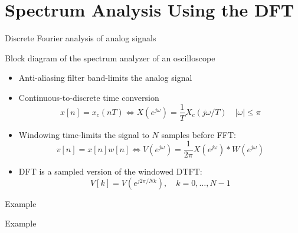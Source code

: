 \documentclass[10pt, aspectratio=169, handout]{beamer}
\begin{document}
\section{Spectrum Analysis Using the DFT}
\begin{frame}{Discrete Fourier analysis of analog signals}

Block diagram of the spectrum analyzer of an oscilloscope
\begin{center}
	\resizebox{0.9\textwidth}{!}{}
\end{center}

\begin{itemize}
	\item Anti-aliasing filter band-limits the analog signal 
	\item Continuous-to-discrete time conversion
	\begin{equation*}
		x[n] = x_c(nT) \Longleftrightarrow X(e^{j\omega}) = \frac{1}{T}X_c(j\omega/T) \quad |\omega| \leq \pi \tag{no aliasing}
	\end{equation*}
	\item Windowing time-limits the signal to $N$ samples before FFT: 
	\begin{equation*}
		v[n] = x[n]w[n] \Longleftrightarrow V(e^{j\omega}) = \frac{1}{2\pi} X(e^{j\omega}) \ast W(e^{j\omega})
	\end{equation*}
	\item DFT is a sampled version of the windowed DTFT:
	\begin{equation*}
		V[k] = V(e^{j2\pi/Nk}), \quad k = 0, \ldots, N-1
	\end{equation*}
\end{itemize}
\end{frame}

%
\begin{frame}{Example}
\centering
{}
\end{frame}

%
\begin{frame}{Example}
\centering
{}
\end{frame}
\end{document}

